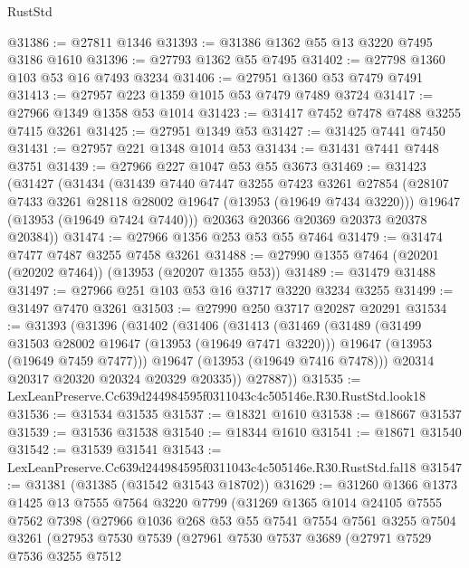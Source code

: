 \begin{lexlean}{RustStd}
\begin{coremodule}
@31386 := @27811 @1346
@31393 := @31386 @1362 @55 @13 @3220 @7495 @3186 @1610
@31396 := @27793 @1362 @55 @7495
@31402 := @27798 @1360 @103 @53 @16 @7493 @3234
@31406 := @27951 @1360 @53 @7479 @7491
@31413 := @27957 @223 @1359 @1015 @53 @7479 @7489 @3724
@31417 := @27966 @1349 @1358 @53 @1014
@31423 := @31417 @7452 @7478 @7488 @3255 @7415 @3261
@31425 := @27951 @1349 @53
@31427 := @31425 @7441 @7450
@31431 := @27957 @221 @1348 @1014 @53
@31434 := @31431 @7441 @7448 @3751
@31439 := @27966 @227 @1047 @53 @55 @3673
@31469 := @31423
    (@31427
      (@31434
        (@31439
          @7440
          @7447
          @3255
          @7423
          @3261
          @27854
          (@28107 @7433 @3261 @28118 @28002 @19647 (@13953 (@19649 @7434 @3220)))
          @19647
          (@13953 (@19649 @7424 @7440)))
        @20363
        @20366
        @20369
        @20373
        @20378
        @20384))
@31474 := @27966 @1356 @253 @53 @55 @7464
@31479 := @31474 @7477 @7487 @3255 @7458 @3261
@31488 := @27990 @1355 @7464 (@20201 (@20202 @7464)) (@13953 (@20207 @1355 @53))
@31489 := @31479 @31488
@31497 := @27966 @251 @103 @53 @16 @3717 @3220 @3234 @3255
@31499 := @31497 @7470 @3261
@31503 := @27990 @250 @3717 @20287 @20291
@31534 := @31393
    (@31396
      (@31402
        (@31406
          (@31413
            (@31469
              (@31489
                (@31499 @31503 @28002 @19647 (@13953 (@19649 @7471 @3220)))
                @19647
                (@13953 (@19649 @7459 @7477)))
              @19647
              (@13953 (@19649 @7416 @7478)))
            @20314
            @20317
            @20320
            @20324
            @20329
            @20335))
        @27887))
@31535 := LexLeanPreserve.Cc639d244984595f0311043c4c505146e.R30.RustStd.look18
@31536 := @31534 @31535
@31537 := @18321 @1610
@31538 := @18667 @31537
@31539 := @31536 @31538
@31540 := @18344 @1610
@31541 := @18671 @31540
@31542 := @31539 @31541
@31543 := LexLeanPreserve.Cc639d244984595f0311043c4c505146e.R30.RustStd.fal18
@31547 := @31381 (@31385 (@31542 @31543 @18702))
@31629 := @31260
    @1366
    @1373
    @1425
    @13
    @7555
    @7564
    @3220
    @7799
    (@31269
      @1365
      @1014
      @24105
      @7555
      @7562
      @7398
      (@27966
        @1036
        @268
        @53
        @55
        @7541
        @7554
        @7561
        @3255
        @7504
        @3261
        (@27953
          @7530
          @7539
          (@27961
            @7530
            @7537
            @3689
            (@27971
              @7529
              @7536
              @3255
              @7512

\end{coremodule}
\end{lexlean}
